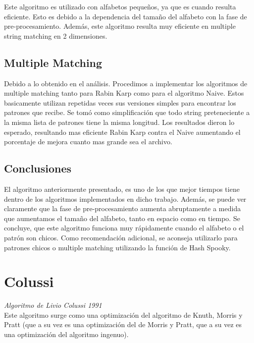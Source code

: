 \documentclass[a4paper, 10pt]{article}
\newcommand\tab[1][0.5cm]{\hspace*{#1}}
\begin{document}
		Este algoritmo es utilizado con alfabetos pequeños, ya que es cuando resulta eficiente. Esto es debido a la dependencia del tamaño del alfabeto con la fase de pre-procesamiento. Además, este algoritmo resulta muy eficiente en multiple string matching en 2 dimensiones.
		
		\subsection{Multiple Matching}
		Debido a lo obtenido en el análisis. Procedimos a implementar los algoritmos de multiple matching tanto para Rabin Karp como para el algoritmo Naive. Estos basicamente utilizan repetidas veces sus versiones simples para encontrar los patrones que recibe. Se tomó como simplificación que todo string preteneciente a la misma lista de patrones tiene la misma longitud. Los resultados dieron lo esperado, resultando mas eficiente Rabin Karp contra el Naive aumentando el porcentaje de mejora cuanto mas grande sea el archivo.
				
				
		\subsection{Conclusiones}
		
		El algoritmo anteriormente presentado, es uno de los que mejor tiempos tiene dentro de los algoritmos implementados en dicho trabajo. Además, se puede ver claramente que la fase de pre-procesamiento aumenta abruptamente a medida que aumentamos el tamaño del alfabeto, tanto en espacio como en tiempo. Se concluye, que este algoritmo funciona muy rápidamente cuando el alfabeto o el patrón son chicos.
Como recomendación adicional, se aconseja utilizarlo para patrones chicos o multiple matching utilizando la función de Hash Spooky. 

	\section{Colussi}
		
		\emph{Algoritmo de Livio Colussi 1991} \\
		
		\tab Este algoritmo surge como una optimización del algoritmo de Knuth, Morris y Pratt (que a su vez es una
   		optimización del de Morris y Pratt, que a su vez es una optimización del algoritmo ingenuo).
		
\end{document}
